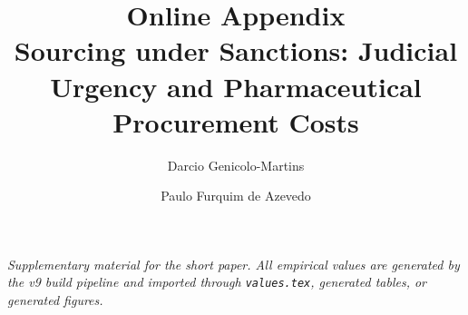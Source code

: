 \documentclass[11pt,authoryear]{elsarticle}
\numberwithin{table}{section}
\numberwithin{figure}{section}
\begin{document}
\begin{frontmatter}
\title{Online Appendix\\[5pt]
\large Sourcing under Sanctions: Judicial Urgency and Pharmaceutical Procurement Costs}
\author[INSPER]{Darcio Genicolo-Martins}
\author[INSPER]{Paulo Furquim de Azevedo}
\address[INSPER]{Insper Institute of Education and Research, S\~ao Paulo, Brazil}
\end{frontmatter}

\noindent\textit{Supplementary material for the short paper. All empirical values are generated by the v9 build pipeline and imported through \texttt{values.tex}, generated tables, or generated figures.}


\end{document}
